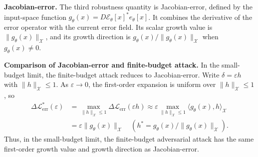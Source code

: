\documentclass[letterpaper]{article} %
\begin{document}
\smallskip
\noindent\textbf{Jacobian-error.}
The third robustness quantity is Jacobian-error, defined by the
input-space function
$g_\theta(x)=D\mathcal{E}_\theta[x]^*e_\theta[x]$. It combines the derivative
of the error operator with the current error field. Its scalar growth value is
$\|g_\theta(x)\|_{\mathcal{X}}$, and its growth direction is
$g_\theta(x)/\|g_\theta(x)\|_{\mathcal{X}}$ when $g_\theta(x)\neq0$.

\smallskip
\noindent\textbf{Comparison of Jacobian-error and finite-budget attack.}
In the small-budget limit, the finite-budget attack reduces to
Jacobian-error. Write
$\delta=\varepsilon h$ with $\|h\|_{\mathcal{X}}\le 1$. As
$\varepsilon\to0$, the first-order expansion is uniform over
$\|h\|_{\mathcal{X}}\le1$, so
\begin{align*}
  \Delta\mathcal{L}_{\mathrm{err}}^*(\varepsilon)
  &=
  \max_{\|h\|_{\mathcal{X}}\le1}
  \Delta\mathcal{L}_{\mathrm{err}}(\varepsilon h)
  \approx
  \varepsilon\max_{\|h\|_{\mathcal{X}}\le 1}
  \langle g_\theta(x),h\rangle_{\mathcal{X}}
  \\
  &=
  \varepsilon\|g_\theta(x)\|_{\mathcal{X}}
  \quad
  \left(
  h^*=g_\theta(x)/\|g_\theta(x)\|_{\mathcal{X}}
  \right).
\end{align*}
Thus, in the small-budget limit, the finite-budget adversarial attack has the
same first-order growth value and growth direction as Jacobian-error.
\end{document}
